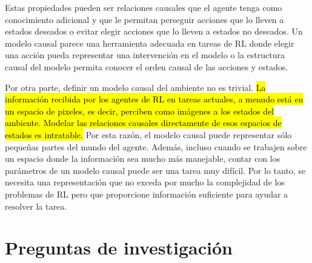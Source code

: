 Estas propiedades pueden ser relaciones causales 
que el agente tenga como conocimiento adicional
y que le permitan perseguir acciones que lo lleven a
estados deseados o evitar elegir acciones que lo lleven a 
estados no deseados. Un modelo causal parece una herramienta adecuada en
tareas de RL donde elegir una acción pueda representar una intervención en el modelo o la estructura causal del modelo permita conocer el orden causal de las acciones y estados.

Por otra parte, definir un modelo causal del ambiente no es trivial.
\hl{La información recibida por los agentes de RL en tareas actuales, a menudo está en un espacio de pixeles, es decir, perciben como imágenes a los estados del ambiente. Modelar las relaciones causales directamente de esos espacios de estados es intratable.}
Por esta razón, el modelo causal puede representar sólo pequeñas partes del mundo del agente. Además, incluso cuando se trabajen sobre un espacio donde la información sea 
mucho más manejable, contar con los parámetros de un modelo causal puede ser una tarea muy difícil. Por lo tanto, se necesita una representación que no exceda por mucho la complejidad de los problemas de RL pero que proporcione información suficiente para ayudar a resolver la tarea.








\section{Preguntas de investigación}

